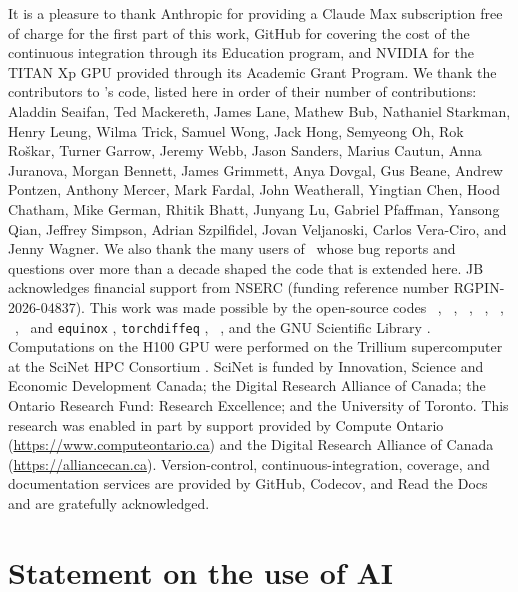 \begin{acknowledgments}
It is a pleasure to thank Anthropic for providing a Claude Max
subscription free of charge for the first part of this work, GitHub
for covering the cost of the continuous integration through its
Education program, and NVIDIA for the TITAN Xp GPU provided through its
Academic Grant Program. We thank the contributors to \galpy's code,
listed here in order of their number of contributions: Aladdin Seaifan,
Ted Mackereth, James Lane, Mathew Bub, Nathaniel Starkman, Henry Leung,
Wilma Trick, Samuel Wong, Jack Hong, Semyeong Oh, Rok Ro\v{s}kar,
Turner Garrow, Jeremy Webb, Jason Sanders, Marius Cautun, Anna Juranova, Morgan
Bennett, James Grimmett, Anya Dovgal, Gus Beane, Andrew Pontzen,
Anthony Mercer, Mark Fardal, John Weatherall, Yingtian Chen, Hood Chatham, Mike
German, Rhitik Bhatt, Junyang Lu, Gabriel Pfaffman, Yansong Qian, Jeffrey
Simpson, Adrian Szpilfidel, Jovan Veljanoski, Carlos Vera-Ciro, and
Jenny Wagner. We also thank the many users of \galpy\ whose
bug reports and questions over more than a decade shaped the code that is
extended here. JB acknowledges financial support from NSERC (funding
reference number \mbox{RGPIN-2026-04837}).
This work was made possible by the open-source codes \numpy\
\citep{Harris2020}, \scipy\ \citep{Virtanen2020}, \matplotlib\
\citep{Hunter2007}, \astropy\ \citep{Astropy2022}, \jax\
\citep{Bradbury2018}, \torch\ \citep{Paszke2019}, \diffrax\ and
\texttt{equinox} \citep{Kidger2021,KidgerGarcia2021}, \texttt{torchdiffeq}
\citep{Chen2018}, \torchode\ \citep{LienenGunnemann2022}, and the GNU Scientific
Library \citep{Galassi2009}. Computations on the H100 GPU were performed
on the Trillium supercomputer at the SciNet HPC Consortium
\citep{Loken2010,Ponce2019}. SciNet is funded by Innovation, Science and
Economic Development Canada; the Digital Research Alliance of Canada; the
Ontario Research Fund: Research Excellence; and the University of Toronto.
This research was enabled in part by support provided by Compute Ontario
(\url{https://www.computeontario.ca}) and the Digital Research Alliance of
Canada (\url{https://alliancecan.ca}).
Version-control, continuous-integration, coverage, and documentation
services are provided by GitHub, Codecov, and Read the Docs and are
gratefully acknowledged.
\end{acknowledgments}

\section*{Statement on the use of AI}

